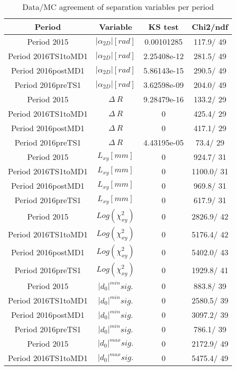 \documentclass{article}
\begin{document}
\begin{longtable}{c|c|c|c}
\caption{\label{tab:sepVarsandSepPeriods}Data/MC agreement of separation variables per period}\\
Period & Variable & KS test & Chi2/ndf \\
\hline
 Period 2015 & $|\alpha_{2D}| [rad]$ & 0.00101285 & 117.9/ 49\\
\hline
 Period 2016TS1toMD1 & $|\alpha_{2D}| [rad]$ & 2.25408e-12 & 281.5/ 49\\
\hline
 Period 2016postMD1 & $|\alpha_{2D}| [rad]$ & 5.86143e-15 & 290.5/ 49\\
\hline
 Period 2016preTS1 & $|\alpha_{2D}| [rad]$ & 3.62598e-09 & 204.0/ 49\\
\hline
 Period 2015 & $\Delta~R$ & 9.28479e-16 & 133.2/ 29\\
\hline
 Period 2016TS1toMD1 & $\Delta~R$ & 0 & 425.4/ 29\\
\hline
 Period 2016postMD1 & $\Delta~R$ & 0 & 417.1/ 29\\
\hline
 Period 2016preTS1 & $\Delta~R$ & 4.43195e-05 &  73.4/ 29\\
\hline
 Period 2015 & $L_{xy} [mm]$ & 0 & 924.7/ 31\\
\hline
 Period 2016TS1toMD1 & $L_{xy} [mm]$ & 0 & 1100.0/ 31\\
\hline
 Period 2016postMD1 & $L_{xy} [mm]$ & 0 & 969.8/ 31\\
\hline
 Period 2016preTS1 & $L_{xy} [mm]$ & 0 & 617.9/ 31\\
\hline
 Period 2015 & $Log(\chi^{2}_{xy})$ & 0 & 2826.9/ 42\\
\hline
 Period 2016TS1toMD1 & $Log(\chi^{2}_{xy})$ & 0 & 5176.4/ 42\\
\hline
 Period 2016postMD1 & $Log(\chi^{2}_{xy})$ & 0 & 5402.0/ 43\\
\hline
 Period 2016preTS1 & $Log(\chi^{2}_{xy})$ & 0 & 1929.8/ 41\\
\hline
 Period 2015 & $|d_{0}|^{min} sig.$ & 0 & 883.8/ 39\\
\hline
 Period 2016TS1toMD1 & $|d_{0}|^{min} sig.$ & 0 & 2580.5/ 39\\
\hline
 Period 2016postMD1 & $|d_{0}|^{min} sig.$ & 0 & 3097.2/ 39\\
\hline
 Period 2016preTS1 & $|d_{0}|^{min} sig.$ & 0 & 786.1/ 39\\
\hline
 Period 2015 & $|d_{0}|^{max} sig.$ & 0 & 2172.9/ 49\\
\hline
 Period 2016TS1toMD1 & $|d_{0}|^{max} sig.$ & 0 & 5475.4/ 49\\

\end{longtable}
\end{document}
